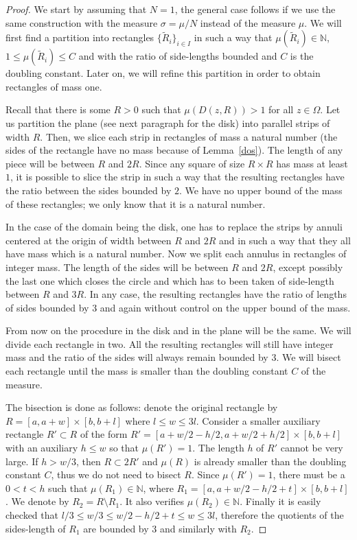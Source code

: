 \documentclass[12pt,twoside,final,psamsfonts]{amsart}
\theoremstyle{plain}
\theoremstyle{remark}
\theoremstyle{definition}
\newcommand{\N}{{\mathbb N}}
\begin{document}
\begin{proof}
We start by assuming that $N=1$, the general case follows if we use the same
construction with the measure $\sigma=\mu/N$ instead of the measure $\mu$. We
will first find a partition into rectangles $\{\widetilde R_i\}_{i\in I}$ in
such a way that $\mu(\widetilde R_i)\in \N$, $1\le\mu(\widetilde R_i)\le C$ 
and with the ratio of side-lengths bounded
and $C$ is the doubling constant. Later on, we will refine this
partition in order to obtain rectangles of mass one. 

Recall that there is some $R>0$ such that $\mu(D(z,R))>1$ for all $z\in\Omega$.
Let us partition the plane (see next paragraph for the disk) 
into parallel strips of width $R$. Then, we
slice each strip in rectangles of mass a natural number (the sides of the
rectangle have no mass because of Lemma~\ref{dos}). 
The length of any piece will be between $R$ and $2R$. 
Since any square of size $R\times R$ has mass at
least $1$, it is possible to slice the strip in such a way that the
resulting rectangles have the ratio between the sides bounded by $2$. 
We have no upper bound of the mass of these rectangles;
we only know that it is a natural number.

In the case of the domain being the disk, one has to replace the strips by
annuli centered at the origin
of width between $R$ and $2R$ and in such a way that they all have
mass which is a natural number. Now we split each annulus in rectangles of 
integer mass. The
length of the sides will be
between $R$ and $2R$, except possibly the last one which closes the circle and
which has to been taken of side-length  between $R$ and $3R$. 
In any case,
the resulting rectangles have the ratio of lengths of 
sides bounded by $3$ and
again without control on the upper bound of the mass.


From now on the procedure in the disk and in the plane will be the same. 
We will divide each rectangle in two. All the resulting rectangles will still
have
integer mass and the ratio of the sides will always remain
bounded by $3$. We will
bisect each rectangle until the mass is smaller than the
doubling constant $C$ of the measure. 

The bisection is done as follows: denote the original rectangle by
$R=[a,a+w]\times [b,b+l]$ where $l\le w\le 3l$. Consider a smaller auxiliary
 rectangle
$R'\subset R$ of the form $R'=[a+w/2-h/2,a+w/2+h/2]\times[b,b+l]$ with an 
auxiliary $h\le w$ so
that $\mu(R')=1$. The length $h$ of $R'$ cannot be very large. 
If $h>w/3$, then
$R\subset 2R'$ and $\mu(R)$ is already smaller than the doubling constant $C$, 
thus we do not need to bisect $R$. Since $\mu(R')=1$, there must be a $0<t<h$ such that
$\mu(R_1)\in\N$, where $R_1=[a,a+w/2-h/2+t]\times[b,b+l]$. We
denote by $R_2=R\setminus R_1$. It also verifies $\mu(R_2)\in \N$. Finally it is
easily checked that $l/3\le w/3\le w/2-h/2+t\le w\le 3l$, therefore the
quotients of the sides-length of $R_1$ are bounded by 3 and similarly with
$R_2$.


\end{proof}
\end{document}

